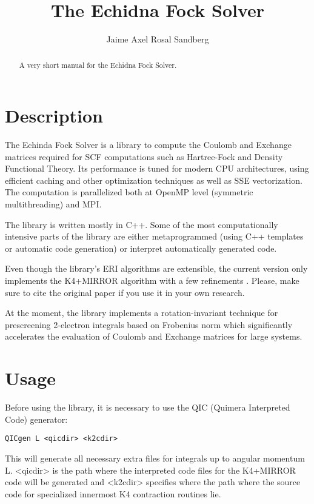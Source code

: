 \documentclass[a4paper,11pt]{paper}
\title{The Echidna Fock Solver}
\author{Jaime Axel Rosal Sandberg}
\begin{document}
\maketitle
\tableofcontents

\begin{abstract}
A very short manual for the Echidna Fock Solver.

\end{abstract}

\section{Description}

The Echinda Fock Solver is a library to compute the Coulomb and Exchange matrices required for SCF computations such as Hartree-Fock and Density Functional Theory. Its performance is tuned for modern CPU architectures, using efficient caching and other optimization techniques as well as SSE vectorization. The computation is parallelized both at OpenMP level (symmetric multithreading) and MPI.

The library is written mostly in C++. Some of the most computationally intensive parts of the library are either metaprogrammed (using C++ templates or automatic code generation) or interpret automatically generated code.

Even though the library's ERI algorithms are extensible, the current version only implements the K4+MIRROR algorithm \cite{K4M} with a few refinements \cite{CDR}. Please, make sure to cite the original paper if you use it in your own research. 

At the moment, the library implements a rotation-invariant technique for prescreening 2-electron integrals based on Frobenius norm which significantly accelerates the evaluation of Coulomb and Exchange matrices for large systems.

\section{Usage}

Before using the library, it is necessary to use the QIC (Quimera Interpreted Code) generator:

\begin{verbatim}
QICgen L <qicdir> <k2cdir>
\end{verbatim}

This will generate all necessary extra files for integrals up to angular momentum L. <qicdir> is the path where the interpreted code files for the K4+MIRROR code will be generated and <k2cdir> specifies where the path where the source code for specialized innermost K4 contraction routines lie.
\end{document}
